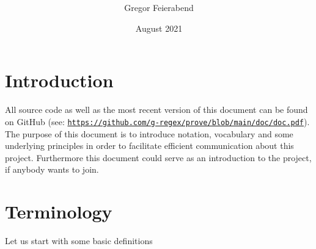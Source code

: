 \documentclass[british]{article}
\title{\name\ }
\author{Gregor Feierabend}
\date{{\large August 2021}}
\begin{document}
\maketitle

\section{Introduction}

All source code as well as the most recent
version of this document can be found on GitHub (see:
\href{https://github.com/g-regex/prove/blob/main/doc/doc.pdf}%
{\texttt{https://github.com/g-regex/prove/blob/main/doc/doc.pdf}}). The purpose
of this document is to introduce notation, vocabulary and some underlying
principles in order to facilitate efficient communication about this project.
Furthermore this document could serve as an introduction to the project, if
anybody wants to join.

\pagebreak{}

\section{Terminology}

Let us start with some basic definitions
\end{document}
